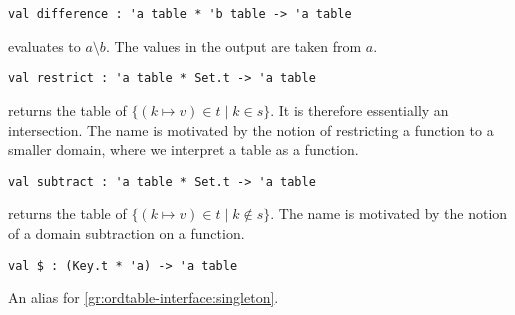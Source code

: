 \begin{cluster}
\label{grp:grm:ordtable-interface::difference}

\begin{gram}[difference]
\label{grm:ordtable-interface::difference}
\begin{verbatim}
val difference : 'a table * 'b table -> 'a table
\end{verbatim}
 evaluates to $a \setminus b$. The values in the output
are taken from $a$.

\end{gram}
\end{cluster}

\begin{cluster}
\label{grp:grm:ordtable-interface::restrict}

\begin{gram}[restrict]
\label{grm:ordtable-interface::restrict}
\begin{verbatim}
val restrict : 'a table * Set.t -> 'a table
\end{verbatim}
 returns the table of $\{(k \mapsto v) \in t \mathbin| k \in s\}$.
It is therefore essentially an intersection. The name is motivated by the
notion of restricting a function to a smaller domain, where we interpret a table
as a function.

\end{gram}
\end{cluster}

\begin{cluster}
\label{grp:grm:ordtable-interface::subtract}

\begin{gram}[subtract]
\label{grm:ordtable-interface::subtract}
\begin{verbatim}
val subtract : 'a table * Set.t -> 'a table
\end{verbatim}
 returns the table of
$\{(k \mapsto v) \in t \mathbin| k \not\in s\}$.
The name is motivated by the notion of a domain subtraction on a function.

\end{gram}
\end{cluster}

\begin{cluster}
\label{grp:grm:ordtable-interface::table}

\begin{gram}[\$]
\label{grm:ordtable-interface::table}
\begin{verbatim}
val $ : (Key.t * 'a) -> 'a table
\end{verbatim}
An alias for \ref{gr:ordtable-interface:singleton}.

\end{gram}
\end{cluster}

